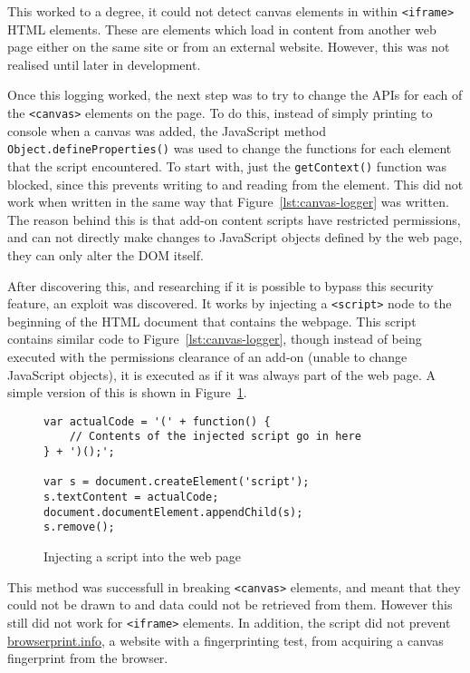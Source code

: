 This worked to a degree, it could not detect canvas elements in within \texttt{<iframe>} HTML elements.
These are elements which load in content from another web page either on the same site or from an external website.
However, this was not realised until later in development.

Once this logging worked, the next step was to try to change the APIs for each of the \texttt{<canvas>} elements on the page.
To do this, instead of simply printing to console when a canvas was added, the JavaScript method \texttt{Object.defineProperties()} was used to change the functions for each element that the script encountered.
To start with, just the \texttt{getContext()} function was blocked, since this prevents writing to and reading from the element.
This did not work when written in the same way that Figure~\ref{lst:canvas-logger} was written.
The reason behind this is that add-on content scripts have restricted permissions, and can not directly make changes to JavaScript objects defined by the web page, they can only alter the DOM itself.

After discovering this, and researching if it is possible to bypass this security feature, an exploit was discovered.
It works by injecting a \texttt{<script>} node to the beginning of the HTML document that contains the webpage.
This script contains similar code to Figure~\ref{lst:canvas-logger}, though instead of being executed with the permissions clearance of an add-on (unable to change JavaScript objects), it is executed as if it was always part of the web page.
A simple version of this is shown in Figure~\ref{lst:injection}.

\begin{figure}[h!]
\begin{lstlisting}
var actualCode = '(' + function() {
    // Contents of the injected script go in here
} + ')();';

var s = document.createElement('script');
s.textContent = actualCode;
document.documentElement.appendChild(s);
s.remove();
\end{lstlisting}
\caption{Injecting a script into the web page}
\label{lst:injection}
\end{figure}

This method was successfull in breaking \texttt{<canvas>} elements, and meant that they could not be drawn to and data could not be retrieved from them.
However this still did not work for \texttt{<iframe>} elements.
In addition, the script did not prevent \url{browserprint.info}, a website with a fingerprinting test, from acquiring a canvas fingerprint from the browser.

